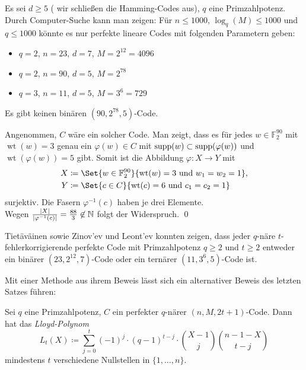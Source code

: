 \documentclass{cheat-sheet}
\newcommand{\F}{\mathbb{F}} %
\DeclareMathOperator{\wt}{wt} %
\newcommand{\Golay}{\mathcal{G}} %
\begin{document}
\begin{bem}
  Es sei $d \geq 5$ (\dh{} wir schließen \zB{} die Hamming-Codes aus), $q$ eine Primzahlpotenz.
  Durch Computer-Suche kann man zeigen:
  Für $n \leq 1000$, $\log_q(M) \leq 1000$ und $q \leq 1000$ könnte es nur perfekte lineare Codes mit folgenden Parametern geben:
  \begin{itemize}
    \item $q=2$, $n=23$, $d=7$, $M=2^{12} = 4096$ %
    \item $q=2$, $n=90$, $d=5$, $M=2^{78}$
    \item $q=3$, $n=11$, $d=5$, $M=3^6=729$ %
  \end{itemize}
\end{bem}

\begin{satz}
  Es gibt keinen binären $(90, 2^{78}, 5)$-Code.
\end{satz}

\begin{beweisidee}
  Angenommen, $C$ wäre ein solcher Code.
  Man zeigt, dass es für jedes $w \in \F_2^{90}$ mit $\wt(w) = 3$ genau ein $\varphi(w) \in C$ mit $\operatorname{supp}(w) \subset \operatorname{supp}(\varphi(w))$ und $\wt(\varphi(w)) = 5$ gibt.
  Somit ist die Abbildung $\varphi : X \to Y$ mit
  \begin{align*}
    X & \coloneqq \Set{w \in \F_2^{90}}{\wt(w) = 3 \text{ und } w_1 = w_2 = 1}, \\
    Y & \coloneqq \Set{c \in C}{\wt(c) = 6 \text{ und } c_1 = c_2 = 1}
  \end{align*}
  surjektiv.
  Die Fasern $\varphi^{-1}(c)$ haben je drei Elemente. \\
  Wegen $\tfrac{\lvert X\rvert}{\lvert\varphi^{-1}(c)\rvert} = \tfrac{88}{3} \not\in \mathbb{N}$ folgt der Widerspruch. \qed
\end{beweisidee}

\begin{bem}
  Tietäväinen sowie Zinov'ev und Leont'ev konnten zeigen, dass jeder $q$-näre $t$-fehlerkorrigierende perfekte Code mit Primzahlpotenz $q \geq 2$ und $t \geq 2$ entweder ein binärer $(23, 2^{12}, 7)$-Code oder ein ternärer $(11, 3^6, 5)$-Code ist.
\end{bem}

Mit einer Methode aus ihrem Beweis lässt sich ein alternativer Beweis des letzten Satzes führen:

\begin{satz}
  Sei $q$ eine Primzahlpotenz, $C$ ein perfekter $q$-närer $(n, M, 2t+1)$-Code.
  Dann hat das \emph{Lloyd-Polynom}
  \[ L_t(X) \coloneqq \sum_{j=0}^t (-1)^j \cdot (q-1)^{t-j} \cdot \binom{X-1}{j} \binom{n-1-X}{t-j} \]
  mindestens $t$ verschiedene Nullstellen in $\{ 1, \ldots, n \}$.
\end{satz}
\end{document}

